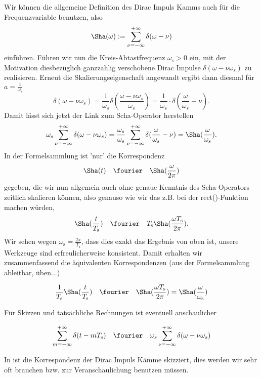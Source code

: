 Wir können die allgemeine Definition des Dirac Impuls Kamms
auch für die Frequenzvariable benutzen, also
\begin{equation}
{\Sha}(\omega) := \sum_{\nu=-\infty}^{+\infty} \delta(\omega-\nu)
\end{equation}
einführen.
Führen wir nun die Kreis-Abtastfrequenz $\omega_\mathrm{s}>0$ ein, mit der Motivation
diesbezüglich ganzzahlig verschobene Dirac Impulse $\delta(\omega - \nu \omega_s)$
zu realisieren.
Erneut die Skalierungseigenschaft angewandt ergibt dann diesmal für
$a=\frac{1}{\omega_\mathrm{s}}$
\begin{equation}
\delta(\omega - \nu \omega_s) =
\frac{1}{\omega_s}\delta(\frac{\omega - \nu \omega_s}{\omega_s}) =
\frac{1}{\omega_s} \cdot \delta(\frac{\omega}{\omega_s}-\nu).
\end{equation}
%
Damit lässt sich jetzt der Link zum Scha-Operator herstellen
\begin{equation}
\omega_s \sum_{\nu=-\infty}^{+\infty} \delta(\omega-\nu \omega_s) =
\frac{\omega_s}{\omega_s} \sum_{\nu=-\infty}^{+\infty} \delta(\frac{\omega}{\omega_s}-\nu) =
{\Sha}(\frac{\omega}{\omega_s}).
\end{equation}
%
In der Formelsammlung ist 'nur' die Korrespondenz
\begin{align}
  \Sha(t) \quad\fourier\quad \Sha(\frac{\omega}{2\pi})
\end{align}
gegeben, die wir nun allgemein auch ohne genaue Kenntnis des Scha-Operators zeitlich
skalieren können, also genauso wie wir das z.B. bei der rect()-Funktion machen würden,
\begin{align}
  \Sha(\frac{t}{T_\mathrm{s}}) \quad\fourier\quad
  T_\mathrm{s} \Sha(\frac{\omega T_\mathrm{s}}{2\pi}).
\end{align}
Wir sehen wegen $\omega_\mathrm{s} = \frac{2 \pi}{T_\mathrm{s}} $,
dass dies exakt das Ergebnis von oben ist, unsere Werkzeuge
sind erfreulicherweise konsistent.
%
Damit erhalten wir zusammenfassend die äquivalenten Korrespondenzen
(aus der Formelsammlung ableitbar, üben...)
\begin{mdframed}
\begin{equation}
\frac{1}{T_\mathrm{s}} {\Sha}(\frac{t}{T_\mathrm{s}}) \quad\fourier\quad
{\Sha}(\frac{\omega T_\mathrm{s}}{2 \pi}) =
\Sha(\frac{\omega}{\omega_\mathrm{s}})
\end{equation}
\end{mdframed}
Für Skizzen und tatsächliche Rechnungen ist eventuell anschaulicher
\begin{mdframed}
\begin{equation}
\sum_{m=-\infty}^{+\infty} \delta(t-m T_\mathrm{s}) \quad\fourier\quad
\omega_s \sum_{\nu=-\infty}^{+\infty} \delta(\omega-\nu \omega_s)
\end{equation}
\end{mdframed}
%
In  ist die Korrespondenz der Dirac Impuls Kämme
skizziert, dies werden wir sehr oft brauchen bzw. zur Veranschaulichung benutzen
müssen.

